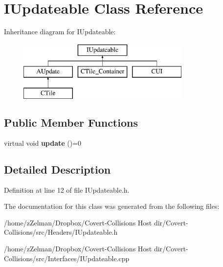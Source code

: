 \hypertarget{classIUpdateable}{\section{I\-Updateable Class Reference}
\label{classIUpdateable}
}
Inheritance diagram for I\-Updateable\-:\begin{figure}[H]
\begin{center}
\leavevmode
\includegraphics[height=3.000000cm]{classIUpdateable}
\end{center}
\end{figure}
\subsection*{Public Member Functions}
\begin{DoxyCompactItemize}
\item 
\hypertarget{classIUpdateable_a46d178a1ecdab33bcaad25d9b38582a5}{virtual void {\bfseries update} ()=0}\label{classIUpdateable_a46d178a1ecdab33bcaad25d9b38582a5}

\end{DoxyCompactItemize}


\subsection{Detailed Description}


Definition at line 12 of file I\-Updateable.\-h.



The documentation for this class was generated from the following files\-:\begin{DoxyCompactItemize}
\item 
/home/z\-Zelman/\-Dropbox/\-Covert-\/\-Collisions Host dir/\-Covert-\/\-Collisions/src/\-Headers/I\-Updateable.\-h\item 
/home/z\-Zelman/\-Dropbox/\-Covert-\/\-Collisions Host dir/\-Covert-\/\-Collisions/src/\-Interfaces/I\-Updateable.\-cpp\end{DoxyCompactItemize}
